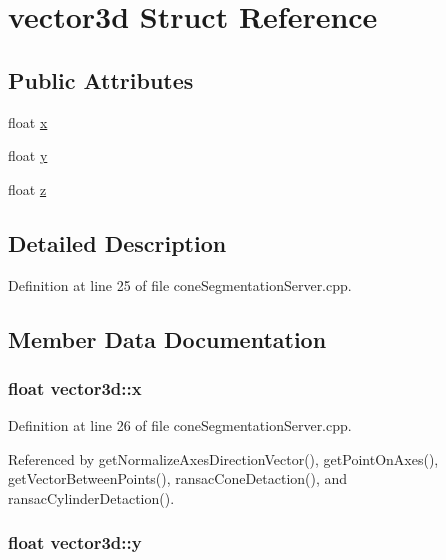 \hypertarget{structvector3d}{\section{vector3d Struct Reference}
\label{structvector3d}
}
\subsection*{Public Attributes}
\begin{DoxyCompactItemize}
\item 
float \hyperlink{structvector3d_add24ba608397ce7664f51369fc6a1ba4}{x}
\item 
float \hyperlink{structvector3d_a64dec3fa34e765f42a7c716dbc4559d2}{y}
\item 
float \hyperlink{structvector3d_a4e5e948ffcf14e91ebec29e889ced5be}{z}
\end{DoxyCompactItemize}


\subsection{Detailed Description}


Definition at line 25 of file cone\-Segmentation\-Server.\-cpp.



\subsection{Member Data Documentation}
\hypertarget{structvector3d_add24ba608397ce7664f51369fc6a1ba4}{
\subsubsection[{x}]{\setlength{\rightskip}{0pt plus 5cm}float vector3d\-::x}}\label{structvector3d_add24ba608397ce7664f51369fc6a1ba4}


Definition at line 26 of file cone\-Segmentation\-Server.\-cpp.



Referenced by get\-Normalize\-Axes\-Direction\-Vector(), get\-Point\-On\-Axes(), get\-Vector\-Between\-Points(), ransac\-Cone\-Detaction(), and ransac\-Cylinder\-Detaction().

\hypertarget{structvector3d_a64dec3fa34e765f42a7c716dbc4559d2}{
\subsubsection[{y}]{\setlength{\rightskip}{0pt plus 5cm}float vector3d\-::y}}\label{structvector3d_a64dec3fa34e765f42a7c716dbc4559d2}


